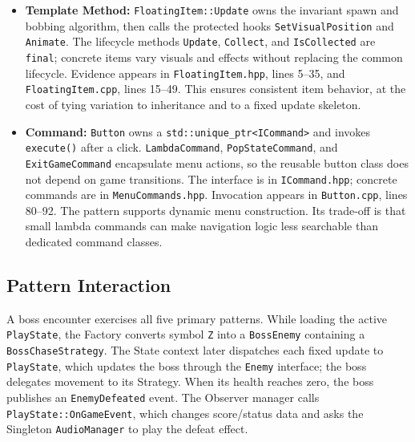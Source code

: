 \documentclass{template}
\begin{document}
\begin{itemize}
    \item \textbf{Template Method:} \texttt{FloatingItem::Update} owns the
          invariant spawn and bobbing algorithm, then calls the protected hooks
          \texttt{SetVisualPosition} and \texttt{Animate}. The lifecycle
          methods \texttt{Update}, \texttt{Collect}, and
          \texttt{IsCollected} are \texttt{final}; concrete items vary visuals
          and effects without replacing the common lifecycle. Evidence appears
          in \texttt{FloatingItem.hpp}, lines 5--35, and
          \texttt{FloatingItem.cpp}, lines 15--49. This ensures consistent item
          behavior, at the cost of tying variation to inheritance and to a
          fixed update skeleton.
    \item \textbf{Command:} \texttt{Button} owns a
          \texttt{std::unique\_ptr<ICommand>} and invokes
          \texttt{execute()} after a click. \texttt{LambdaCommand},
          \texttt{PopStateCommand}, and \texttt{ExitGameCommand} encapsulate
          menu actions, so the reusable button class does not depend on game
          transitions. The interface is in \texttt{ICommand.hpp}; concrete
          commands are in \texttt{MenuCommands.hpp}. Invocation appears in
          \texttt{Button.cpp}, lines 80--92.
          The pattern supports dynamic menu construction. Its trade-off is
          that small lambda commands can make navigation logic less searchable
          than dedicated command classes.
\end{itemize}

\subsection{Pattern Interaction}

A boss encounter exercises all five primary patterns. While loading the
active \texttt{PlayState}, the Factory converts symbol \texttt{Z} into a
\texttt{BossEnemy} containing a \texttt{BossChaseStrategy}. The State context
later dispatches each fixed update to \texttt{PlayState}, which updates the
boss through the \texttt{Enemy} interface; the boss delegates movement to its
Strategy. When its health reaches zero, the boss publishes an
\texttt{EnemyDefeated} event. The Observer manager calls
\texttt{PlayState::OnGameEvent}, which changes score/status data and asks the
Singleton \texttt{AudioManager} to play the defeat effect.
\end{document}
